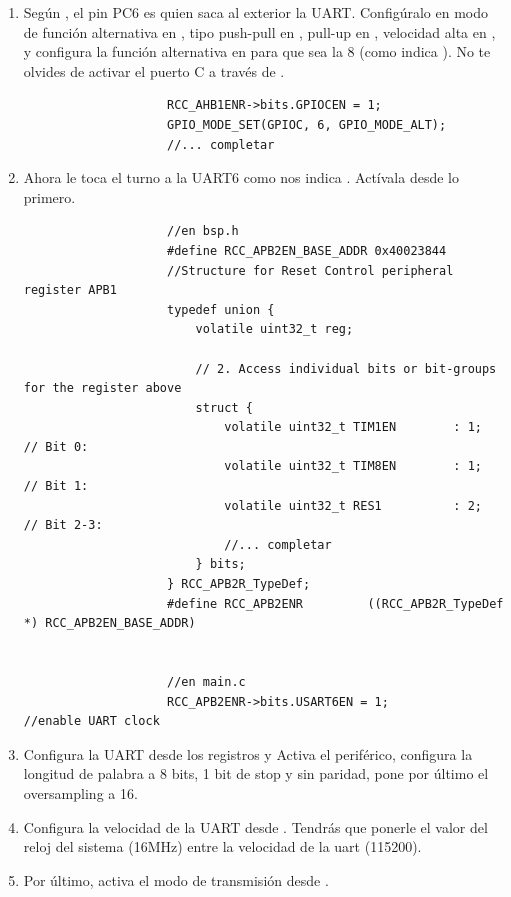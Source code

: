 \documentclass[../main.tex]{subfiles}
\begin{document}
        \begin{enumerate}
            \item Según \DSMAN[Table 10], el pin PC6 es quien saca al exterior la UART. Configúralo en modo de función alternativa en , tipo push-pull en , pull-up en , velocidad alta en , y configura la función alternativa en  para que sea la 8 (como indica \DSMAN[Table 12]). No te olvides de activar el puerto C a través de .
            
                \begin{lstlisting}
                    RCC_AHB1ENR->bits.GPIOCEN = 1;
                    GPIO_MODE_SET(GPIOC, 6, GPIO_MODE_ALT);
                    //... completar
                \end{lstlisting}

            \item Ahora le toca el turno a la UART6 como nos indica \BRDMAN[5.13]. Actívala desde  lo primero.
            
                \begin{lstlisting}
                    //en bsp.h
                    #define RCC_APB2EN_BASE_ADDR 0x40023844
                    //Structure for Reset Control peripheral register APB1
                    typedef union {
                        volatile uint32_t reg;

                        // 2. Access individual bits or bit-groups for the register above
                        struct {
                            volatile uint32_t TIM1EN	   	: 1;  // Bit 0:
                            volatile uint32_t TIM8EN	   	: 1;  // Bit 1:
                            volatile uint32_t RES1		   	: 2;  // Bit 2-3:
                            //... completar
                        } bits;
                    } RCC_APB2R_TypeDef;
                    #define RCC_APB2ENR			((RCC_APB2R_TypeDef *) RCC_APB2EN_BASE_ADDR)

                    
                    //en main.c
                    RCC_APB2ENR->bits.USART6EN = 1; 		//enable UART clock
                \end{lstlisting}

            \item Configura la UART desde los registros  y  Activa el periférico, configura la longitud de palabra a 8 bits, 1 bit de stop y sin paridad, pone por último el oversampling a 16.
            \item Configura la velocidad de la UART desde . Tendrás que ponerle el valor del reloj del sistema (16MHz) entre la velocidad de la uart (115200).
            \item Por último, activa el modo de transmisión desde .
            

\end{enumerate}
\end{document}
